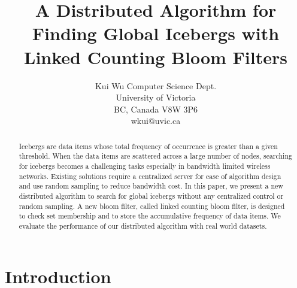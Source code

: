 \documentclass[11pt,twocolumn]{IEEEtran} %
\begin{document}
\title{A Distributed Algorithm for Finding Global Icebergs with Linked Counting Bloom Filters} %

\author{
\and    Kui Wu
    Computer Science Dept.\\
    University of Victoria\\
    BC, Canada V8W 3P6\\
    wkui@uvic.ca\\
}


\maketitle

\begin{abstract}
Icebergs are data items whose total frequency of occurrence is greater than a given threshold. When the data items are scattered across a large number of nodes, searching for icebergs becomes a challenging tasks especially in bandwidth limited wireless networks. Existing solutions require a centralized server for ease of algorithm design and use random sampling to reduce bandwidth cost. In this paper, we present a new distributed algorithm to search for global icebergs without any centralized control or random sampling.  A new bloom filter, called linked counting bloom filter, is designed to check set membership and to store the accumulative frequency of data items. We evaluate the performance of our distributed algorithm with real world datasets. 

\end{abstract}


\section{Introduction}
\end{document}

